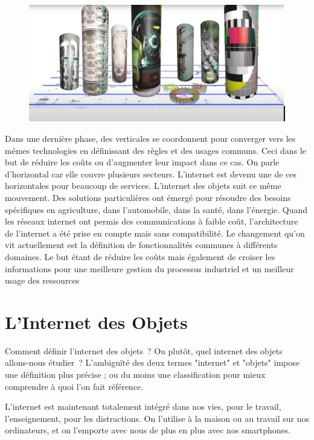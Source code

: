 ~

\begin{figure}
\centerline{\includegraphics[width=.4\columnwidth]{Pictures/ill-horizontales.png}}
\end{figure}
Dans une dernière phase, des verticales se coordonnent pour converger vers les mêmes technologies en définissant des règles et des usages communs. Ceci dans le but de réduire les coûts ou d'augmenter leur impact dans ce cas. On parle d'horizontal car elle couvre plusieurs secteurs. L'internet est devenu une de ces horizontales pour beaucoup de services. L'internet des objets suit ce même mouvement. Des solutions particulières ont émergé pour résoudre des besoins spécifiques en agriculture, dans l'automobile, dans la santé, dans l'énergie. Quand les réseaux internet ont permis des communications à faible coût, l'architecture de l'internet a été prise en compte mais sans compatibilité. Le changement qu'on vit actuellement est la définition de fonctionnalités communes à différents domaines. Le but étant de réduire les coûts mais également de croiser les informations pour une meilleure gestion du processus industriel et un meilleur usage des ressources
 

  \vspace{2em}

\section{L'Internet des Objets}

  \vspace{1em}
  
 Comment définir l’internet des objets~? Ou plutôt, quel internet des objets allons-nous étudier~? L’ambiguïté des deux termes "internet" et "objets" impose une définition plus précise ; ou du moins une classification pour mieux comprendre à quoi l’on fait référence.

  \vspace{1em}


L’internet est maintenant totalement intégré dans nos vies, pour le travail, l’enseignement, pour les distractions. On l’utilise à la maison ou au travail sur nos ordinateurs, et on l'emporte avec nous de plus en plus avec nos smartphones. 

